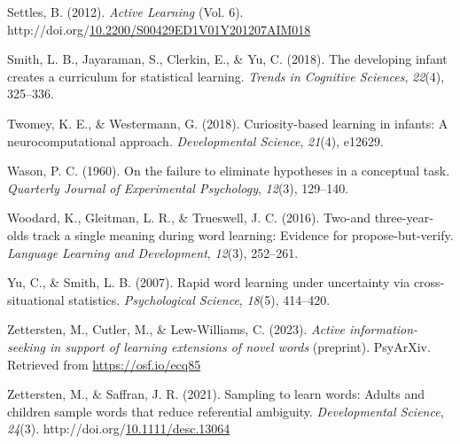 \documentclass[10pt, letterpaper]{article}
\newenvironment{CSLReferences}%
  {}%
  {\par}
\begin{document}
\begin{CSLReferences}
Settles, B. (2012). \emph{Active {Learning}} (Vol. 6).
http://doi.org/\href{https://doi.org/10.2200/S00429ED1V01Y201207AIM018}{10.2200/S00429ED1V01Y201207AIM018}

Smith, L. B., Jayaraman, S., Clerkin, E., \& Yu, C. (2018). The
developing infant creates a curriculum for statistical learning.
\emph{Trends in Cognitive Sciences}, \emph{22}(4), 325--336.

Twomey, K. E., \& Westermann, G. (2018). Curiosity-based learning in
infants: A neurocomputational approach. \emph{Developmental Science},
\emph{21}(4), e12629.

Wason, P. C. (1960). On the failure to eliminate hypotheses in a
conceptual task. \emph{Quarterly Journal of Experimental Psychology},
\emph{12}(3), 129--140.

Woodard, K., Gleitman, L. R., \& Trueswell, J. C. (2016). Two-and
three-year-olds track a single meaning during word learning: Evidence
for propose-but-verify. \emph{Language Learning and Development},
\emph{12}(3), 252--261.

Yu, C., \& Smith, L. B. (2007). Rapid word learning under uncertainty
via cross-situational statistics. \emph{Psychological Science},
\emph{18}(5), 414--420.

Zettersten, M., Cutler, M., \& Lew-Williams, C. (2023). \emph{Active
information-seeking in support of learning extensions of novel words}
(preprint). PsyArXiv. Retrieved from \url{https://osf.io/ecq85}

Zettersten, M., \& Saffran, J. R. (2021). Sampling to learn words:
Adults and children sample words that reduce referential ambiguity.
\emph{Developmental Science}, \emph{24}(3).
http://doi.org/\href{https://doi.org/10.1111/desc.13064}{10.1111/desc.13064}

\end{CSLReferences}
\end{document}
